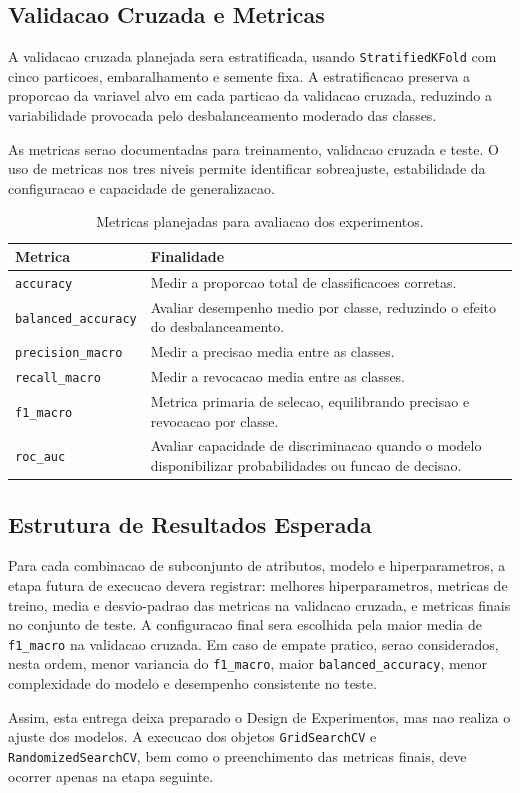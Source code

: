 \subsection{Validacao Cruzada e Metricas}

A validacao cruzada planejada sera estratificada, usando \texttt{StratifiedKFold} com cinco particoes, embaralhamento e semente fixa. A estratificacao preserva a proporcao da variavel alvo em cada particao da validacao cruzada, reduzindo a variabilidade provocada pelo desbalanceamento moderado das classes.

As metricas serao documentadas para treinamento, validacao cruzada e teste. O uso de metricas nos tres niveis permite identificar sobreajuste, estabilidade da configuracao e capacidade de generalizacao.

\begin{table}[htbp]
\centering
\caption{Metricas planejadas para avaliacao dos experimentos.}
\label{tab:metricas_doe}
\begin{tabular}{p{} p{}}
\hline
\textbf{Metrica} & \textbf{Finalidade} \\
\hline
\texttt{accuracy} & Medir a proporcao total de classificacoes corretas. \\
\texttt{balanced\_accuracy} & Avaliar desempenho medio por classe, reduzindo o efeito do desbalanceamento. \\
\texttt{precision\_macro} & Medir a precisao media entre as classes. \\
\texttt{recall\_macro} & Medir a revocacao media entre as classes. \\
\texttt{f1\_macro} & Metrica primaria de selecao, equilibrando precisao e revocacao por classe. \\
\texttt{roc\_auc} & Avaliar capacidade de discriminacao quando o modelo disponibilizar probabilidades ou funcao de decisao. \\
\hline
\end{tabular}
\end{table}

\subsection{Estrutura de Resultados Esperada}

Para cada combinacao de subconjunto de atributos, modelo e hiperparametros, a etapa futura de execucao devera registrar: melhores hiperparametros, metricas de treino, media e desvio-padrao das metricas na validacao cruzada, e metricas finais no conjunto de teste. A configuracao final sera escolhida pela maior media de \texttt{f1\_macro} na validacao cruzada. Em caso de empate pratico, serao considerados, nesta ordem, menor variancia do \texttt{f1\_macro}, maior \texttt{balanced\_accuracy}, menor complexidade do modelo e desempenho consistente no teste.

Assim, esta entrega deixa preparado o Design de Experimentos, mas nao realiza o ajuste dos modelos. A execucao dos objetos \texttt{GridSearchCV} e \texttt{RandomizedSearchCV}, bem como o preenchimento das metricas finais, deve ocorrer apenas na etapa seguinte.
